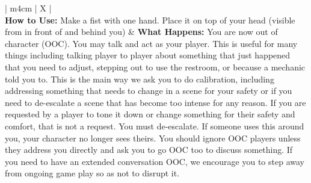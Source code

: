 \documentclass[sheet]{GL2020}
\begin{document}
\begin{tabularx}{\textwidth}{| m{4cm} | X |}
\hline
	\\
\hline
	\textbf{How to Use:} Make a fist with one hand. Place it on top of your head (visible from in front of and behind you) & \textbf{\newline What Happens:} You are now out of character (OOC). You may talk and act as your player. This is useful for many things including talking player to player about something that just happened that you need to adjust, stepping out to use the restroom, or because a mechanic told you to. \newline\newline This is the main way we ask you to do calibration, including addressing something that needs to change in a scene for your safety or if you need to de-escalate a scene that has become too intense for any reason. If you are requested by a player to tone it down or change something for their safety and comfort, that is not a request. You must de-escalate. \newline\newline If someone uses this around you, your character no longer sees theirs. You should ignore OOC players unless they address you directly and ask you to go OOC too to discuss something. If you need to have an extended conversation OOC, we encourage you to step away from ongoing game play so as not to disrupt it. \newline \\
\hline
	\\

\end{tabularx}
\end{document}
